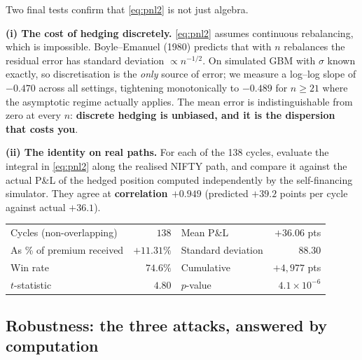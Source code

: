 \documentclass[11pt,a4paper]{article}
\begin{document}
Two final tests confirm that \eqref{eq:pnl2} is not just algebra.

\textbf{(i) The cost of hedging discretely.} \eqref{eq:pnl2} assumes continuous rebalancing,
which is impossible. Boyle--Emanuel (1980) predicts that with $n$ rebalances the residual error
has standard deviation $\propto n^{-1/2}$. On simulated GBM with $\sigma$ known exactly, so
discretisation is the \emph{only} source of error; we measure a log--log slope of $-0.470$
across all settings, tightening monotonically to $\mathbf{-0.489}$ for $n\ge21$ where the
asymptotic regime actually applies. The mean error is indistinguishable from zero at every $n$:
\textbf{discrete hedging is unbiased, and it is the dispersion that costs you}.

\textbf{(ii) The identity on real paths.} For each of the 138 cycles, evaluate the integral in
\eqref{eq:pnl2} along the realised NIFTY path, and compare it against the actual P\&L of the
hedged position computed independently by the self-financing simulator. They agree at
\textbf{correlation $+0.949$} (predicted $+39.2$ points per cycle against actual $+36.1$).

\begin{table}[H]
\centering\small
\begin{tabular}{lr@{\qquad}lr}
\toprule
Cycles (non-overlapping) & $138$ & Mean P\&L & $+36.06$ pts \\
As \% of premium received & $+11.31\%$ & Standard deviation & $88.30$ \\
Win rate & $74.6\%$ & Cumulative & $+4{,}977$ pts \\
$t$-statistic & $4.80$ & $p$-value & $4.1\times10^{-6}$ \\
\bottomrule
\end{tabular}
\end{table}

\subsection{Robustness: the three attacks, answered by computation}
\label{sec:robustexp}
\end{document}
